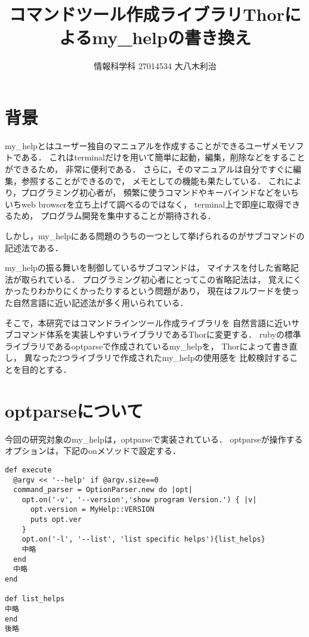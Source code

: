 \documentclass[a4j,twocolumn,uplatex]{jsarticle}
\begin{document}
\title{コマンドツール作成ライブラリThorによるmy\_helpの書き換え}
\author{情報科学科 \hspace{5mm} 27014534 \hspace{5mm} 大八木利治}
\date{}
\maketitle
\section{背景}
my\_helpとはユーザー独自のマニュアルを作成することができるユーザメモソフトである．
これはterminalだけを用いて簡単に起動，編集，削除などをすることができるため，
非常に便利である．
さらに，そのマニュアルは自分ですぐに編集，参照することができるので，
メモとしての機能も果たしている．
これにより，プログラミング初心者が，
頻繁に使うコマンドやキーバインドなどをいちいちweb browserを立ち上げて調べるのではなく，
terminal上で即座に取得できるため，
プログラム開発を集中することが期待される．

しかし，my\_helpにある問題のうちの一つとして挙げられるのがサブコマンドの記述法である．

my\_helpの振る舞いを制御しているサブコマンドは，
マイナスを付した省略記法が取られている．
プログラミング初心者にとってこの省略記法は，
覚えにくかったりわかりにくかったりするという問題があり，
現在はフルワードを使った自然言語に近い記述法が多く用いられている．

そこで，本研究ではコマンドラインツール作成ライブラリを
自然言語に近いサブコマンド体系を実装しやすいライブラリであるThorに変更する．
rubyの標準ライブラリであるoptparseで作成されているmy\_helpを，
Thor\cite{erikhuda}によって書き直し，
異なった2つライブラリで作成されたmy\_helpの使用感を
比較検討することを目的とする．

\section{optparseについて}
今回の研究対象のmy\_helpは，optparseで実装されている．
optparseが操作するオプションは，下記のonメソッドで設定する．

\begin{lstlisting}[style=customRuby,basicstyle={\scriptsize\ttfamily}]
def execute
  @argv << '--help' if @argv.size==0
  command_parser = OptionParser.new do |opt|
    opt.on('-v', '--version','show program Version.') { |v|
      opt.version = MyHelp::VERSION
      puts opt.ver
    }
    opt.on('-l', '--list', 'list specific helps'){list_helps}
    中略
  end
  中略
end

def list_helps
中略
end
後略
\end{lstlisting}
\end{document}
